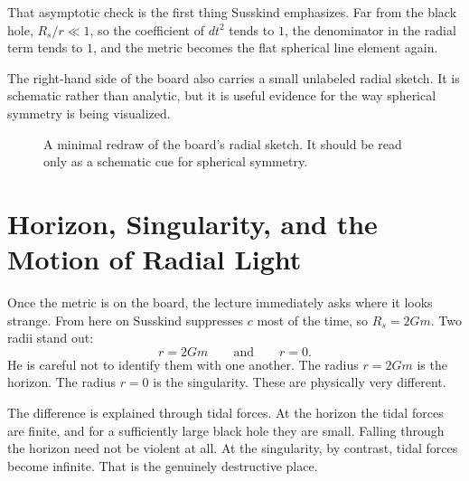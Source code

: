That asymptotic check is the first thing Susskind emphasizes. Far from the black hole, \(R_s/r\ll 1\), so the coefficient of \(dt^2\) tends to \(1\), the denominator in the radial term tends to \(1\), and the metric becomes the flat spherical line element again.

The right-hand side of the board also carries a small unlabeled radial sketch. It is schematic rather than analytic, but it is useful evidence for the way spherical symmetry is being visualized.

\begin{figure}[h]
\centering
{}
\caption{A minimal redraw of the board's radial sketch. It should be read only as a schematic cue for spherical symmetry.}
\end{figure}

\section{Horizon, Singularity, and the Motion of Radial Light}

Once the metric is on the board, the lecture immediately asks where it looks strange. From here on Susskind suppresses \(c\) most of the time, so \(R_s=2Gm\). Two radii stand out:
\begin{equation}
r=2Gm
\qquad\text{and}\qquad
r=0.
\end{equation}
He is careful not to identify them with one another. The radius \(r=2Gm\) is the horizon. The radius \(r=0\) is the singularity. These are physically very different.

The difference is explained through tidal forces. At the horizon the tidal forces are finite, and for a sufficiently large black hole they are small. Falling through the horizon need not be violent at all. At the singularity, by contrast, tidal forces become infinite. That is the genuinely destructive place.

